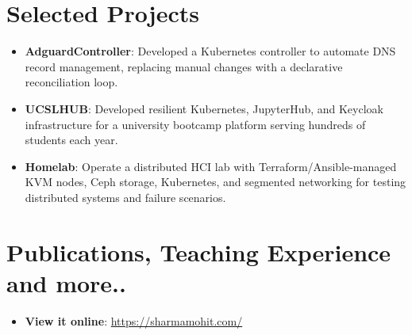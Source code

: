 \documentclass[letterpaper,11pt]{article}
\newcommand{\resumeItem}[2]{\item\small{\textbf{#1}{: #2 \vspace{-2pt}}}}
\newcommand{\resumeSubItem}[2]{\resumeItem{#1}{#2}\vspace{-4pt}}
\newcommand{\resumeSubHeadingListStart}{\begin{itemize}[leftmargin=*]}
\newcommand{\resumeSubHeadingListEnd}{\end{itemize}}
\begin{document}
\section{\color[HTML]{DF691A} Selected Projects}
\resumeSubHeadingListStart
\resumeSubItem{AdguardController}{Developed a Kubernetes controller to automate DNS record management, replacing manual changes with a declarative reconciliation loop.}
\resumeSubItem{UCSLHUB}{Developed resilient Kubernetes, JupyterHub, and Keycloak infrastructure for a university bootcamp platform serving hundreds of students each year.}
\resumeSubItem{Homelab}{Operate a distributed HCI lab with Terraform/Ansible-managed KVM nodes, Ceph storage, Kubernetes, and segmented networking for testing distributed systems and failure scenarios.}
\resumeSubHeadingListEnd

\section{\color[HTML]{DF691A} Publications, Teaching Experience and more..}
\resumeSubHeadingListStart
\resumeItem{View it online}{\href{https://sharmamohit.com/work/}{https://sharmamohit.com/}}
\resumeSubHeadingListEnd
\end{document}
